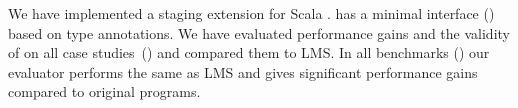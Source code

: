 We have implemented a staging extension for Scala \tool \footnotemark[3].
 \tool has a minimal interface () based on type annotations.
 We have evaluated performance gains and the validity of \tool on all case
 studies~() and compared them to LMS. In all benchmarks ()
 our evaluator performs the same as LMS and gives significant performance gains compared to original programs.


